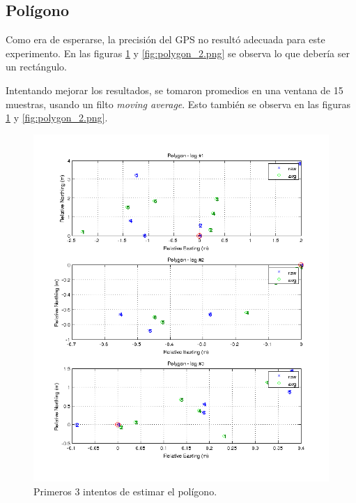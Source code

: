 \documentclass[spanish,12pt,a4paper,titlepage]{report}
\begin{document}
\newpage
\subsection{Polígono}
\label{sec:poligono}

Como era de esperarse, la precisión del GPS no resultó adecuada para este experimento. En las figuras \ref{fig:polygon_1.png} y \ref{fig:polygon_2.png} se observa lo que debería ser un rectángulo.

Intentando mejorar los resultados, se tomaron promedios en una ventana de 15 muestras, usando un filto \textit{moving average}. Esto también se observa en las figuras \ref{fig:polygon_1.png} y \ref{fig:polygon_2.png}.

\begin{figure}[h!]
  \begin{center}
  \includegraphics[width=1.1\textwidth]{./img/polygon_1.png}
  \end{center}
  \caption{Primeros 3 intentos de estimar el polígono.}
  \label{fig:polygon_1.png}
\end{figure}
\end{document}
